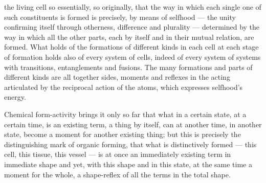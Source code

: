 \documentclass[12pt,a4paper]{book}
\begin{document}
the living cell so essentially, so originally, that the way in which each
single one of such constituents is formed is precisely, by means of selfhood
--- the unity confirming itself through otherness, difference and plurality ---
determined by the way in which all the other parts, each by itself and in their
mutual relation, are formed. What holds of the formations of different kinds in
each cell at each stage of formation holds also of every system of cells,
indeed of every system of systems with transitions, entanglements and fusions.
The many formations and parts of different kinds are all together sides,
moments and reflexes in the acting articulated by the reciprocal action of the
atoms, which expresses selfhood's energy.

Chemical form-activity brings it only so far that what in a certain state, at a
certain time, is an existing
term, a thing by itself, can at another time, in another state, become a moment
for another existing thing; but this is precisely the distinguishing mark of
organic forming, that what is distinctively formed --- this cell, this tissue,
this vessel --- is at once an immediately existing term in immediate shape and
yet, with this shape and in this state, at the same time a moment for the
whole, a shape-reflex of all the terms in the total shape.
\end{document}

